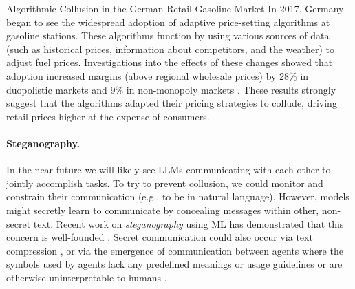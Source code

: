\begin{case-study}[label=cs:ai_collusion]{Algorithmic Collusion in the German Retail Gasoline Market}
    In 2017, Germany began to see the widespread adoption of adaptive price-setting algorithms at gasoline stations. These algorithms function by using various sources of data (such as historical prices, information about competitors, and the weather) to adjust fuel prices.
    Investigations into the effects of these changes showed that adoption increased margins (above regional wholesale prices) by 28\% in duopolistic markets and 9\% in non-monopoly markets \citep{Assad2020German}.
    These results strongly suggest that the algorithms adapted their pricing strategies to collude, driving retail prices higher at the expense of consumers.
\end{case-study}

\paragraph{Steganography.}
In the near future we will likely see LLMs communicating with each other to jointly accomplish tasks.
To try to prevent collusion, we could monitor and constrain their communication (e.g., to be in natural language). 
However, models might secretly learn to communicate by concealing messages within other, non-secret text.
Recent work on \textit{steganography} using ML has demonstrated that this concern is well-founded \citep[see also ]{Hu2018,Yang2019,SchroederdeWitt2023,Roger2023,Mathew2024}. 
Secret communication could also occur via text compression \citep{OpenAI2023c}, or via the emergence of communication between agents where the symbols used by agents lack any predefined meanings or usage guidelines or are otherwise uninterpretable to humans \citep{Lazaridou2020,Foerster2016,Sukhbaatar2016}.

